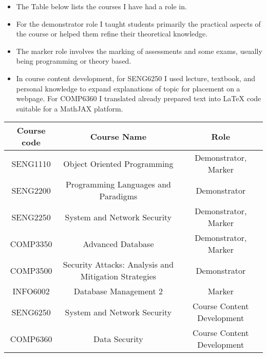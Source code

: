 \documentclass{myresume}
\begin{document}
            \begin{itemize}
                \item The Table below lists the courses I have had a role in.
                \item For the demonstrator role I taught students primarily the
                        practical aspects of the course or helped them refine
                            their theoretical knowledge.
                \item The marker role involves the marking of assessments and
                        some exams, usually being programming or theory based.
                \item In course content development, for SENG6250 I used lecture, textbook,
                        and personal knowledge to expand explanations of topic
                            for placement on a webpage. For COMP6360 I
                            translated already prepared text into LaTeX code
                            suitable for a MathJAX platform.
            \end{itemize}
        \begin{center}
        \begin{tabular}{ c | c | c }
                \hline
                \textbf{Course code} & \textbf{Course Name} &
                \textbf{Role} \\
                \hline
                \hline
                SENG1110 & Object Oriented Programming & Demonstrator, Marker \\
                \hline
                SENG2200 & Programming Languages and Paradigms & Demonstrator \\
                \hline
                SENG2250 & System and Network Security & Demonstrator, Marker \\
                \hline
                COMP3350 & Advanced Database & Demonstrator, Marker \\
                \hline
                COMP3500 & Security Attacks: Analysis and Mitigation Strategies & Demonstrator \\
                \hline
                INFO6002 & Database Management 2 & Marker \\
                \hline
                SENG6250 & System and Network Security & Course Content
                Development \\
                \hline
                COMP6360 & Data Security & Course Content Development \\
                \hline
        \end{tabular}
        \end{center}
\end{document}

